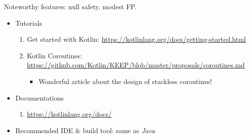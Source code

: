 \documentclass{article}
\begin{document}
\begin{itemize}
    Noteworthy features: null safety, modest FP.
    \begin{itemize}
        \item Tutorials
        \begin{enumerate}
            \item Get started with Kotlin:
            \href{https://kotlinlang.org/docs/getting-started.html}{https://kotlinlang.org/docs/getting-started.html}
            \item Kotlin Coroutines:\\
            \href{https://github.com/Kotlin/KEEP/blob/master/proposals/coroutines.md}{https://github.com/Kotlin/KEEP/blob/master/proposals/coroutines.md}
            \begin{itemize}
                \item Wonderful article about the design of stackless coroutines!
            \end{itemize}
        \end{enumerate}
        \item Documentations
        \begin{enumerate}
            \item        \href{https://kotlinlang.org/docs/}{https://kotlinlang.org/docs/}
        \end{enumerate}
        \item Recommended IDE \& build tool: same as \emph{Java}
    \end{itemize}
    

\end{itemize}
\end{document}
